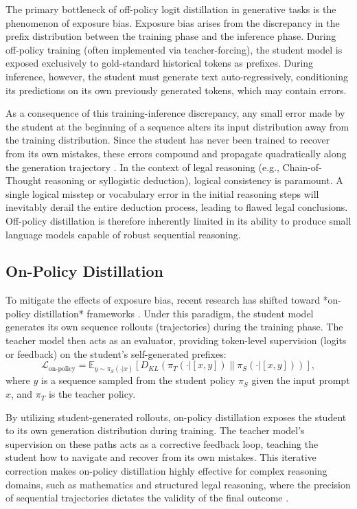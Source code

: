 The primary bottleneck of off-policy logit distillation in generative tasks is the phenomenon of exposure bias. Exposure bias arises from the discrepancy in the prefix distribution between the training phase and the inference phase. During off-policy training (often implemented via teacher-forcing), the student model is exposed exclusively to gold-standard historical tokens as prefixes. During inference, however, the student must generate text auto-regressively, conditioning its predictions on its own previously generated tokens, which may contain errors.

As a consequence of this training-inference discrepancy, any small error made by the student at the beginning of a sequence alters its input distribution away from the training distribution. Since the student has never been trained to recover from its own mistakes, these errors compound and propagate quadratically along the generation trajectory \parencite{agarwal2024onpolicydistillationlanguagemodels}. In the context of legal reasoning (e.g., Chain-of-Thought reasoning or syllogistic deduction), logical consistency is paramount. A single logical misstep or vocabulary error in the initial reasoning steps will inevitably derail the entire deduction process, leading to flawed legal conclusions. Off-policy distillation is therefore inherently limited in its ability to produce small language models capable of robust sequential reasoning.

\subsection{On-Policy Distillation}

To mitigate the effects of exposure bias, recent research has shifted toward *on-policy distillation* frameworks \parencite{agarwal2024onpolicydistillationlanguagemodels}. Under this paradigm, the student model generates its own sequence rollouts (trajectories) during the training phase. The teacher model then acts as an evaluator, providing token-level supervision (logits or feedback) on the student's self-generated prefixes:
\begin{equation}
    \mathcal{L}_{\text{on-policy}} = \mathbb{E}_{y \sim \pi_S(\cdot|x)} \left[ D_{KL}\left(\pi_T(\cdot|[x, y]) \parallel \pi_S(\cdot|[x, y])\right) \right],
\end{equation}
where $y$ is a sequence sampled from the student policy $\pi_S$ given the input prompt $x$, and $\pi_T$ is the teacher policy.

By utilizing student-generated rollouts, on-policy distillation exposes the student to its own generation distribution during training. The teacher model's supervision on these paths acts as a corrective feedback loop, teaching the student how to navigate and recover from its own mistakes. This iterative correction makes on-policy distillation highly effective for complex reasoning domains, such as mathematics \parencite{adarsh-etal-2025-siked} and structured legal reasoning, where the precision of sequential trajectories dictates the validity of the final outcome \parencite{song2026surveyonpolicydistillationlarge, zhao2026selfdistilledreasoneronpolicyselfdistillation}.

